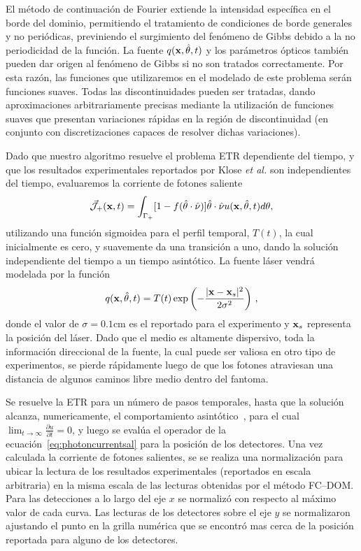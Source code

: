 El método de continuación de Fourier extiende 
la intensidad específica en el borde del dominio, 
permitiendo el tratamiento de condiciones de borde generales y no periódicas, 
previniendo el surgimiento del fenómeno de Gibbs debido a la no periodicidad 
de la función. La fuente $q(\mathbf{x},\hat{\theta},t)$ y los parámetros ópticos 
también pueden dar origen al fenómeno de Gibbs si no son 
tratados correctamente. Por esta razón, las funciones que utilizaremos 
en el modelado de este problema serán funciones suaves. Todas las discontinuidades pueden
ser tratadas, dando aproximaciones arbitrariamente precisas 
mediante la utilización de funciones suaves que presentan 
variaciones rápidas en la región de discontinuidad (en conjunto 
con discretizaciones capaces de resolver dichas variaciones).

Dado que nuestro algoritmo resuelve el problema ETR dependiente del tiempo, 
y que los resultados experimentales reportados por Klose \textit{et al.} 
son independientes del tiempo, evaluaremos la corriente de fotones saliente 
\begin{equation}
 \vec{ \mathcal{J}}_+(\mathbf{x},t)=\int_{\Gamma_+} [1-f(\hat{\theta} \cdot \hat{\nu})] \hat{\theta} \cdot \hat{\nu} u(\mathbf{x},\hat{\theta},t) d\theta,
\label{eq:photoncurrentsal}
\end{equation}
utilizando una función sigmoidea para el perfil temporal, $T(t)$,
la cual inicialmente es cero, y suavemente da una transición 
a uno, dando la solución independiente del tiempo a un tiempo asintótico. 
La fuente láser vendrá modelada por la función
\begin{equation}
q(\mathbf{x},\hat{\theta},t)=T(t)\exp \left(  -\frac{|\mathbf{x}-\mathbf{x}_s|^2}{2\sigma^2} \right)  \, ,
\label{eq:sourceGauss}
\end{equation}
donde el valor de $\sigma=0.1$cm es el reportado para el experimento y $\mathbf{x}_s$ 
representa la posición del láser. 
Dado que el medio es altamente dispersivo, toda la información 
direccional de la fuente, la cual 
puede ser valiosa en otro tipo de experimentos, se pierde rápidamente luego de que los fotones 
atraviesan una distancia de algunos caminos libre medio dentro del fantoma. 

Se resuelve la ETR para un número de pasos temporales, 
hasta que la solución alcanza, numericamente, el comportamiento 
asintótico~\cite{Bruno2010}, para el cual $\lim_{t\to \infty} \frac{\partial u}{\partial t}=0$, 
y luego se evalúa el operador de la ecuación~\eqref{eq:photoncurrentsal} 
para la posición de los detectores.
Una vez  calculada la corriente de fotones salientes, se
se realiza una normalización para ubicar la lectura 
de los resultados experimentales (reportados en escala arbitraria) 
en la misma escala de las lecturas obtenidas por el método FC--DOM. 
Para las detecciones a lo largo del eje $x$ se normalizó 
con respecto al máximo valor de cada curva. 
 Las lecturas de los detectores sobre el eje $y$ 
 se normalizaron ajustando el punto en la grilla numérica 
 que se encontró mas cerca de la posición reportada 
 para alguno de los detectores. 
 
